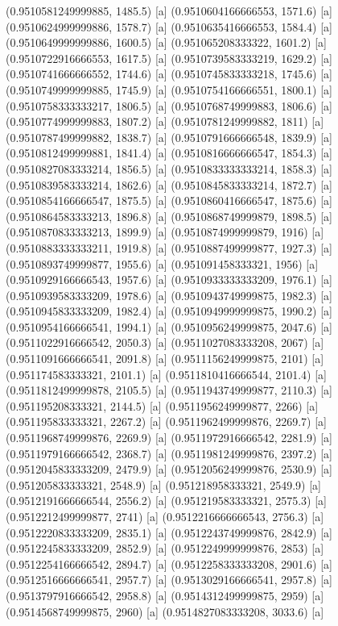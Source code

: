 {{{(0.9510581249999885, 1485.5) [a] 
(0.9510604166666553, 1571.6) [a] 
(0.9510624999999886, 1578.7) [a] 
(0.9510635416666553, 1584.4) [a] 
(0.9510649999999886, 1600.5) [a] 
(0.951065208333322, 1601.2) [a] 
(0.9510722916666553, 1617.5) [a] 
(0.9510739583333219, 1629.2) [a] 
(0.9510741666666552, 1744.6) [a] 
(0.9510745833333218, 1745.6) [a] 
(0.9510749999999885, 1745.9) [a] 
(0.9510754166666551, 1800.1) [a] 
(0.9510758333333217, 1806.5) [a] 
(0.9510768749999883, 1806.6) [a] 
(0.9510774999999883, 1807.2) [a] 
(0.9510781249999882, 1811) [a] 
(0.9510787499999882, 1838.7) [a] 
(0.9510791666666548, 1839.9) [a] 
(0.9510812499999881, 1841.4) [a] 
(0.9510816666666547, 1854.3) [a] 
(0.9510827083333214, 1856.5) [a] 
(0.9510833333333214, 1858.3) [a] 
(0.9510839583333214, 1862.6) [a] 
(0.9510845833333214, 1872.7) [a] 
(0.9510854166666547, 1875.5) [a] 
(0.9510860416666547, 1875.6) [a] 
(0.9510864583333213, 1896.8) [a] 
(0.9510868749999879, 1898.5) [a] 
(0.9510870833333213, 1899.9) [a] 
(0.9510874999999879, 1916) [a] 
(0.9510883333333211, 1919.8) [a] 
(0.9510887499999877, 1927.3) [a] 
(0.9510893749999877, 1955.6) [a] 
(0.951091458333321, 1956) [a] 
(0.9510929166666543, 1957.6) [a] 
(0.9510933333333209, 1976.1) [a] 
(0.9510939583333209, 1978.6) [a] 
(0.9510943749999875, 1982.3) [a] 
(0.9510945833333209, 1982.4) [a] 
(0.9510949999999875, 1990.2) [a] 
(0.9510954166666541, 1994.1) [a] 
(0.9510956249999875, 2047.6) [a] 
(0.9511022916666542, 2050.3) [a] 
(0.9511027083333208, 2067) [a] 
(0.9511091666666541, 2091.8) [a] 
(0.9511156249999875, 2101) [a] 
(0.951174583333321, 2101.1) [a] 
(0.9511810416666544, 2101.4) [a] 
(0.9511812499999878, 2105.5) [a] 
(0.9511943749999877, 2110.3) [a] 
(0.951195208333321, 2144.5) [a] 
(0.9511956249999877, 2266) [a] 
(0.951195833333321, 2267.2) [a] 
(0.9511962499999876, 2269.7) [a] 
(0.9511968749999876, 2269.9) [a] 
(0.9511972916666542, 2281.9) [a] 
(0.9511979166666542, 2368.7) [a] 
(0.9511981249999876, 2397.2) [a] 
(0.9512045833333209, 2479.9) [a] 
(0.9512056249999876, 2530.9) [a] 
(0.951205833333321, 2548.9) [a] 
(0.951218958333321, 2549.9) [a] 
(0.9512191666666544, 2556.2) [a] 
(0.951219583333321, 2575.3) [a] 
(0.9512212499999877, 2741) [a] 
(0.9512216666666543, 2756.3) [a] 
(0.9512220833333209, 2835.1) [a] 
(0.9512243749999876, 2842.9) [a] 
(0.9512245833333209, 2852.9) [a] 
(0.9512249999999876, 2853) [a] 
(0.9512254166666542, 2894.7) [a] 
(0.9512258333333208, 2901.6) [a] 
(0.9512516666666541, 2957.7) [a] 
(0.9513029166666541, 2957.8) [a] 
(0.9513797916666542, 2958.8) [a] 
(0.9514312499999875, 2959) [a] 
(0.9514568749999875, 2960) [a] 
(0.9514827083333208, 3033.6) [a] 
}}}

